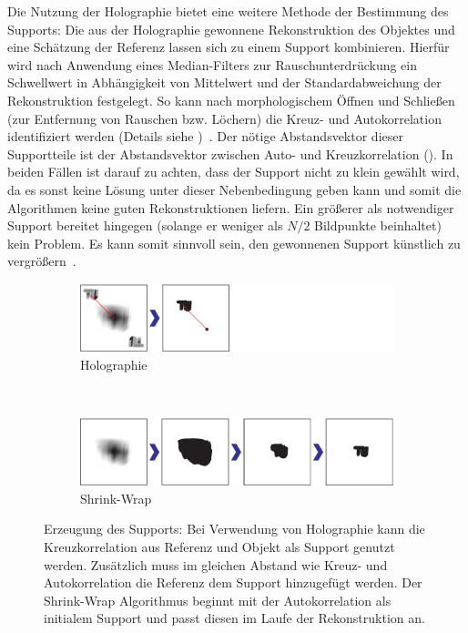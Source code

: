 Die Nutzung der Holographie bietet eine weitere Methode der Bestimmung des Supports: Die aus der Holographie gewonnene Rekonstruktion des Objektes und eine Schätzung der Referenz lassen sich zu einem Support kombinieren. Hierfür wird nach Anwendung eines Median-Filters zur Rauschunterdrückung ein Schwellwert in Abhängigkeit von Mittelwert und der Standardabweichung der Rekonstruktion festgelegt. So kann nach morphologischem Öffnen und Schließen (zur Entfernung von Rauschen bzw. Löchern) die Kreuz- und Autokorrelation identifiziert werden (Details siehe )~\cite{gonzalez2006}. Der nötige Abstandsvektor dieser Supportteile ist der Abstandsvektor zwischen Auto- und Kreuzkorrelation ().
In beiden Fällen ist darauf zu achten, dass der Support nicht zu klein gewählt wird, da es sonst keine Lösung unter dieser Nebenbedingung geben kann und somit die Algorithmen keine guten Rekonstruktionen liefern. Ein größerer als notwendiger Support bereitet hingegen (solange er weniger als $N/2$ Bildpunkte beinhaltet) kein Problem. Es kann somit sinnvoll sein, den gewonnenen Support künstlich zu vergrößern~\cite{huang2010}.

\begin{figure}
	\centering
	\begin{subfigure}[b]{0.9\textwidth}
		\includegraphics[width=\textwidth]{images/support_holo.pdf}
		\caption{Holographie}
	\end{subfigure}\\

	\begin{subfigure}[b]{0.9\textwidth}
		\includegraphics[width=\textwidth]{images/support_sw.pdf}
		\caption{Shrink-Wrap}	
	\end{subfigure}
	
	\caption[Supportgenerierung]{Erzeugung des Supports: Bei Verwendung von Holographie kann die Kreuzkorrelation aus Referenz und Objekt als Support genutzt werden. Zusätzlich muss im gleichen Abstand wie Kreuz- und Autokorrelation die Referenz dem Support hinzugefügt werden. Der Shrink-Wrap Algorithmus beginnt mit der Autokorrelation als initialem Support und passt diesen im Laufe der Rekonstruktion an.}
	\label{fig:support}
\end{figure} 

